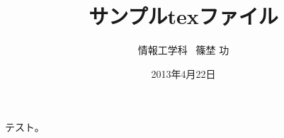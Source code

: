 \documentclass[a4j,12pt]{jarticle}
\title{サンプルtexファイル}
\date{2013年4月22日}
\author{情報工学科 \ 篠埜 功}
\begin{document}
\maketitle

テスト。
\end{document}
